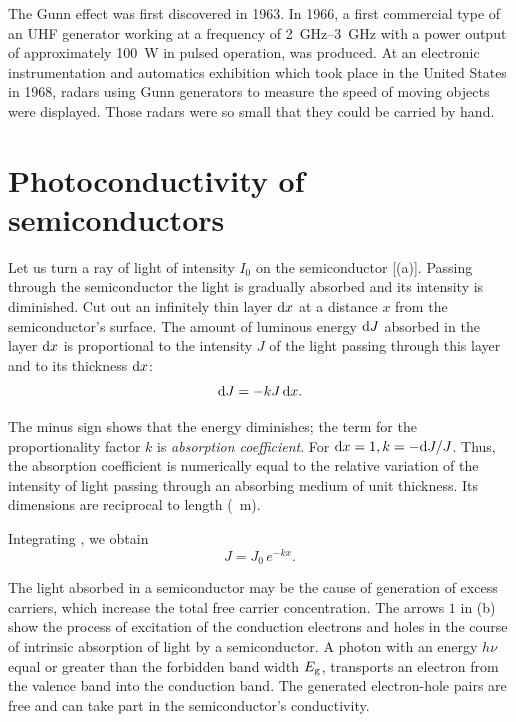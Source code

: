 The Gunn effect was first discovered in 1963. In 1966, a first commercial type of an UHF generator working at a frequency of \SIrange{2}{3}{\giga\hertz}
with a power output of approximately \SI{100}{\watt} in pulsed operation, was produced. At an electronic instrumentation and automatics exhibition which took place in the United States in 1968, radars using Gunn generators to measure the speed of moving objects were displayed. Those radars were so small that they could be carried by hand.

\section{Photoconductivity of semiconductors}\label{sec:60}

Let us turn a ray of light of intensity $I_0$ on the semiconductor [(a)]. Passing through the semiconductor the light is gradually absorbed and its intensity is diminished. Cut out an infinitely thin layer $\mathrm{d} x$ at a distance $x$ from the semiconductor's surface. The amount of luminous energy $\mathrm{d} J$ absorbed in the layer $\mathrm{d} x$ is proportional to the intensity $J$ of the light passing through this layer and to its thickness $\mathrm{d} x$:
\begin{equation}\label{eq:6_42}
	\mathrm{d} J = -kJ\, \mathrm{d} x.
\end{equation}

\noindent
The minus sign shows that the energy diminishes; the term for the proportionality factor $k$ is \textit{absorption coefficient}. For $\mathrm{d} x=1, k =-\mathrm{d} J/J$. Thus, the absorption coefficient is numerically equal to the relative variation of the intensity of light passing through an absorbing medium of unit thickness. Its dimensions are reciprocal to length (\si{\per\metre}).

Integrating , we obtain
\begin{equation}\label{eq:6_43}
	J = J_0\, e^{-kx}.
\end{equation}

\noindent
The light absorbed in a semiconductor may be the cause of generation of excess carriers, which increase the total free carrier concentration. The arrows $1$ in (b) show the process of excitation of the conduction electrons and holes in the course of intrinsic absorption of light by a semiconductor. A photon with an energy $h\nu$ equal or greater than the forbidden band width $E_{\text{g}}$, transports an electron from the valence band into the conduction band. The generated electron-hole pairs are free and can take part in the semiconductor's conductivity.

